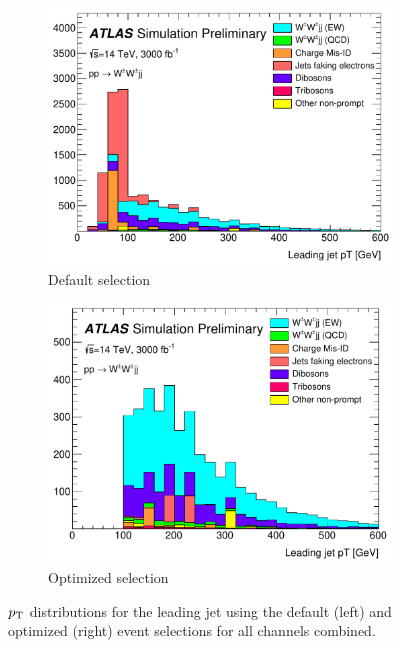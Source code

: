 \begin{figure}[htbp]
  \centering
  \begin{subfigure}[b]{.48\textwidth}
    \includegraphics[width=\textwidth]{figs/ssww_upgrade/distributions/default/all_pass9_jet0_pt-cropped}
    \caption{Default selection}
    \label{fig:sswwupgrade_jet0pt_compare_d}
  \end{subfigure}
  \begin{subfigure}[b]{.474\textwidth}
  \includegraphics[width=\textwidth]{figs/ssww_upgrade/distributions/optimized/all_pass9_jet0_pt-cropped}
    \caption{Optimized selection}
    \label{fig:sswwupgrade_jet0pt_compare_o}
  \end{subfigure}
  \caption{$p_{\mathrm{T}}$ distributions for the leading jet using the default (left) and optimized (right) event selections for all channels combined.}
  \label{fig:sswwupgrade_jet0pt_compare}
\end{figure}

